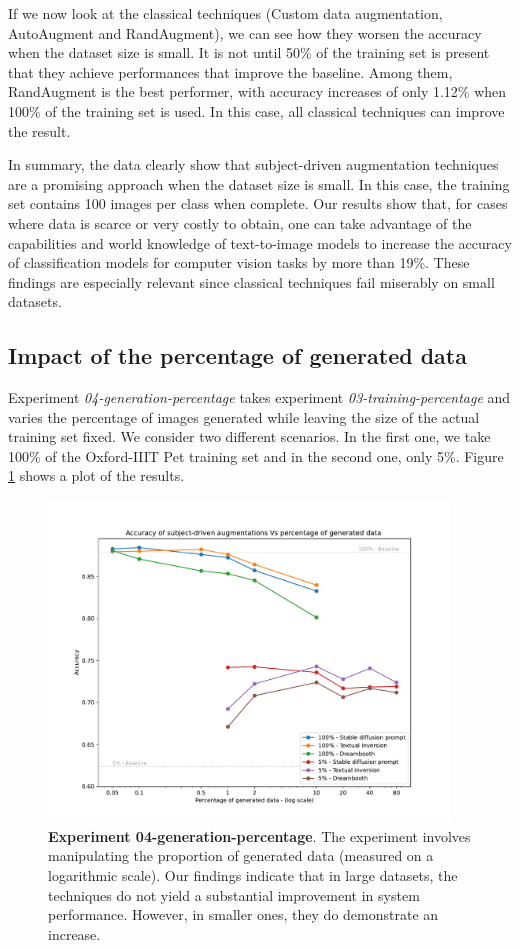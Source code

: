 If we now look at the classical techniques (Custom data augmentation, AutoAugment and RandAugment), we can see how they worsen the accuracy when the dataset size is small. It is not until 50\% of the training set is present that they achieve performances that improve the baseline. Among them, RandAugment is the best performer, with accuracy increases of only 1.12\% when 100\% of the training set is used. In this case, all classical techniques can improve the result.

In summary, the data clearly show that subject-driven augmentation techniques are a promising approach when the dataset size is small. In this case, the training set contains 100 images per class when complete. Our results show that, for cases where data is scarce or very costly to obtain, one can take advantage of the capabilities and world knowledge of text-to-image models to increase the accuracy of classification models for computer vision tasks by more than 19\%. These findings are especially relevant since classical techniques fail miserably on small datasets.

\subsection{Impact of the percentage of generated data} \label{sec: exp-04}

Experiment \textit{04-generation-percentage} takes experiment \textit{03-training-percentage} and varies the percentage of images generated while leaving the size of the actual training set fixed. We consider two different scenarios. In the first one, we take 100\% of the Oxford-IIIT Pet training set and in the second one, only 5\%. Figure \ref{fig:exp4} shows a plot of the results. 

\begin{figure}[th]
    \centering
    \includegraphics[width=0.95\textwidth]{Pictures/experiment_004.pdf}
    \caption{\textbf{Experiment 04-generation-percentage}. The experiment involves manipulating the proportion of generated data (measured on a logarithmic scale). Our findings indicate that in large datasets, the techniques do not yield a substantial improvement in system performance. However, in smaller ones, they do demonstrate an increase.}
    \label{fig:exp4}
\end{figure}

